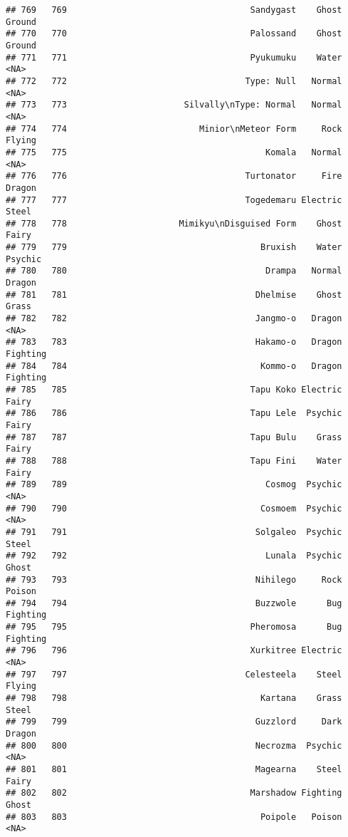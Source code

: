 \documentclass[
]{article}
\begin{document}
\begin{verbatim}
## 769   769                                    Sandygast    Ghost   Ground
## 770   770                                    Palossand    Ghost   Ground
## 771   771                                    Pyukumuku    Water     <NA>
## 772   772                                   Type: Null   Normal     <NA>
## 773   773                       Silvally\nType: Normal   Normal     <NA>
## 774   774                          Minior\nMeteor Form     Rock   Flying
## 775   775                                       Komala   Normal     <NA>
## 776   776                                   Turtonator     Fire   Dragon
## 777   777                                   Togedemaru Electric    Steel
## 778   778                      Mimikyu\nDisguised Form    Ghost    Fairy
## 779   779                                      Bruxish    Water  Psychic
## 780   780                                       Drampa   Normal   Dragon
## 781   781                                     Dhelmise    Ghost    Grass
## 782   782                                     Jangmo-o   Dragon     <NA>
## 783   783                                     Hakamo-o   Dragon Fighting
## 784   784                                      Kommo-o   Dragon Fighting
## 785   785                                    Tapu Koko Electric    Fairy
## 786   786                                    Tapu Lele  Psychic    Fairy
## 787   787                                    Tapu Bulu    Grass    Fairy
## 788   788                                    Tapu Fini    Water    Fairy
## 789   789                                       Cosmog  Psychic     <NA>
## 790   790                                      Cosmoem  Psychic     <NA>
## 791   791                                     Solgaleo  Psychic    Steel
## 792   792                                       Lunala  Psychic    Ghost
## 793   793                                     Nihilego     Rock   Poison
## 794   794                                     Buzzwole      Bug Fighting
## 795   795                                    Pheromosa      Bug Fighting
## 796   796                                    Xurkitree Electric     <NA>
## 797   797                                   Celesteela    Steel   Flying
## 798   798                                      Kartana    Grass    Steel
## 799   799                                     Guzzlord     Dark   Dragon
## 800   800                                     Necrozma  Psychic     <NA>
## 801   801                                     Magearna    Steel    Fairy
## 802   802                                    Marshadow Fighting    Ghost
## 803   803                                      Poipole   Poison     <NA>

\end{verbatim}
\end{document}
